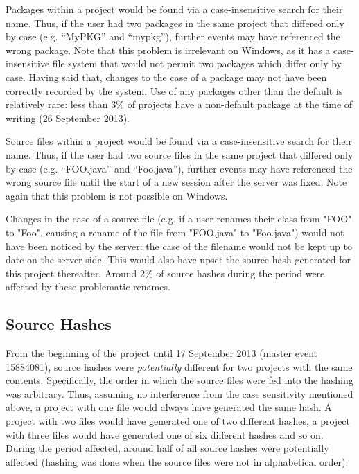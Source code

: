 \documentclass{report}
\begin{document}
Packages within a project would be found via a case-insensitive search for their name.  Thus, if the user had two packages in the same project that differed only by case (e.g. ``MyPKG'' and ``mypkg''), further events may have referenced the wrong package.  Note that this problem is irrelevant on Windows, as it has a case-insensitive file system that would not permit two packages which differ only by case.  Having said that, changes to the case of a package may not have been correctly recorded by the system.  Use of any packages other than the default is relatively rare: less than 3\% of projects have a non-default package at the time of writing (26 September 2013).

Source files within a project would be found via a case-insensitive search for their name.  Thus, if the user had two source files in the same project that differed only by case (e.g. ``FOO.java'' and ``Foo.java''), further events may have referenced the wrong source file until the start of a new session after the server was fixed.  Note again that this problem is not possible on Windows.

Changes in the case of a source file (e.g. if a user renames their class from "FOO" to "Foo", causing a rename of the file from "FOO.java" to "Foo.java") would not have been noticed by the server: the case of the filename would not be kept up to date on the server side.  This would also have upset the source hash generated for this project thereafter.  Around 2\% of source hashes during the period were affected by these problematic renames.

\subsection{Source Hashes}

From the beginning of the project until 17 September 2013 (master event 15884081), source hashes were \textit{potentially} different for two projects with the same contents.  Specifically, the order in which the source files were fed into the hashing was arbitrary.  Thus, assuming no interference from the case sensitivity mentioned above, a project with one file would always have generated the same hash.  A project with two files would have generated one of two different hashes, a project with three files would have generated one of six different hashes and so on.  During the period affected, around half of all source hashes were potentially affected (hashing was done when the source files were not in alphabetical order).
\end{document}
